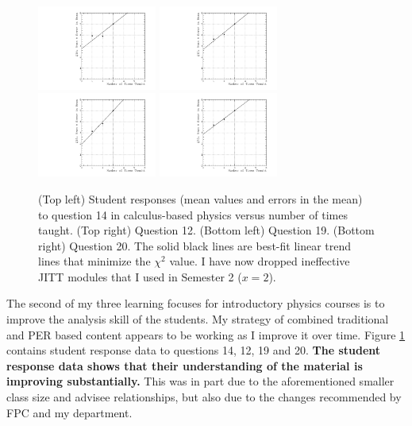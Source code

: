 \documentclass[../../main.tex]{subfiles}
\begin{document}
\begin{figure}
\centering
\includegraphics[width=0.35\textwidth]{Q14_calculus_based.pdf}
\includegraphics[width=0.35\textwidth]{Q12_calculus_based.pdf}
\includegraphics[width=0.35\textwidth]{Q19_calculus_based.pdf}
\includegraphics[width=0.35\textwidth]{Q20_calculus_based.pdf}
\caption{\label{fig:courses:intro_q14_2}  (Top left) Student responses (mean values and errors in the mean) to question 14 in calculus-based physics versus number of times taught.  (Top right) Question 12. (Bottom left) Question 19. (Bottom right) Question 20.  The solid black lines are best-fit linear trend lines that minimize the $\chi^2$ value.  I have now dropped ineffective JITT modules that I used in Semester 2 ($x=2$).}
\end{figure}

The second of my three learning focuses for introductory physics courses is to improve the analysis skill of the students.  My strategy of combined traditional and PER based content appears to be working as I improve it over time.  Figure \ref{fig:courses:intro_q14_2} contains student response data to questions 14, 12, 19 and 20.  \textbf{The student response data shows that their understanding of the material is improving substantially.}  This was in part due to the aforementioned smaller class size and advisee relationships, but also due to the changes recommended by FPC and my department. \\ \hspace{0.1cm}
\end{document}
